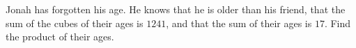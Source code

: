 Jonah has forgotten his age. He knows that he is older than his friend, that the sum of the cubes of their ages is $1241$, and that the sum of their ages is $17$. Find the product of their ages.
